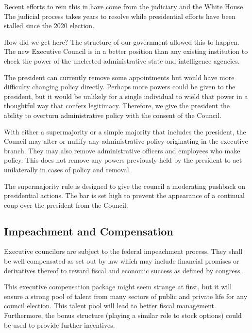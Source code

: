 \documentclass{article}
\begin{document}
Recent efforts to rein this in have come from the judiciary\cite{Crowell} and the White House\cite{ScheduleF}. The judicial process takes years to resolve while presidential efforts have been stalled since the 2020 election.

How did we get here? The structure of our government allowed this to happen. The new Executive Council is in a better position than any existing institution to check the power of the unelected administrative state and intelligence agencies.

The president can currently remove some appointments but would have more difficulty changing policy directly\cite{Fairlie}. Perhaps more powers could be given to the president, but it would be unlikely for a single individual to wield that power in a thoughtful way that confers legitimacy. Therefore, we give the president the ability to overturn administrative policy with the consent of the Council.

\begin{quoting}
With either a supermajority or a simple majority that includes the president, the Council may alter or nullify any administrative policy originating in the executive branch. They may also remove administrative officers and employees who make policy. This does not remove any powers previously held by the president to act unilaterally in cases of policy and removal.
\end{quoting}

The supermajority rule is designed to give the council a moderating pushback on presidential actions. The bar is set high to prevent the appearance of a continual coup over the president from the Council.

\subsection{Impeachment and Compensation}

\begin{quoting}
Executive councilors are subject to the federal impeachment process. They shall be well compensated as set out by law which may include financial promises or derivatives thereof to reward fiscal and economic success as defined by congress.
\end{quoting}

This executive compensation package might seem strange at first, but it will ensure a strong pool of talent from many sectors of public and private life for any council election. This talent pool will lead to better fiscal management. Furthermore, the bonus structure (playing a similar role to stock options) could be used to provide further incentives.
\end{document}
